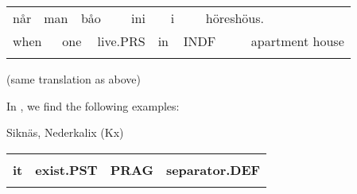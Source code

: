 \begin{tabular}{llllllllllll}
\lsptoprule
når & \multicolumn{2}{l}{man

} & \multicolumn{2}{l}{båo 

} & \multicolumn{2}{l}{ini

} & \multicolumn{2}{l}{i

} & \multicolumn{2}{l}{höreshöus.

} & \\
\multicolumn{2}{l}{when

} & \multicolumn{2}{l}{one

} & \multicolumn{2}{l}{live.PRS

} & \multicolumn{2}{l}{in

} & \multicolumn{2}{l}{INDF

} & \multicolumn{2}{l}{apartment house

}\\
\lspbottomrule
\end{tabular}

\begin{styleTranslation}
(same translation as above)

\end{styleTranslation}

\begin{styleBodyTextFirst}
In \citet{Stenberg1971}, we find the following examples:

\end{styleBodyTextFirst}


\begin{listWWNumileveli}
\item {}

\begin{styleExample}
Siknäs, Nederkalix (Kx)

\end{styleExample}

\end{listWWNumileveli}

\begin{listWWNumxlvleveli}
\item {}

\end{listWWNumxlvleveli}

\begin{tabular}{llll}
\lsptoprule
\multicolumn{4}{l}{{\bfseries He}

}\\
{\bfseries it} & {\bfseries exist.PST} & {\bfseries PRAG} & {\bfseries separator.DEF}\\
\lspbottomrule
\end{tabular}

